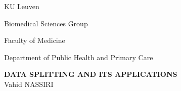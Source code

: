 \begin{titlepage}
{\selectfont
\vspace*{-2.9cm}
{
\centerline{KU Leuven \hfill }
\centerline{Biomedical Sciences Group \hfill }
\centerline{Faculty of Medicine \hfill } 
\centerline{Department of Public Health and Primary Care \hfill } }
\vspace*{-2.2cm}
\hspace{2cm}


\begin{minipage}{1.2\textwidth}													%
\begin{flushleft} %
\vspace{2cm}
\hspace{1cm}\textbf{\Large{DATA SPLITTING AND ITS APPLICATIONS}} \\

\vspace{0.7cm}
\hspace{1cm}\large{Vahid NASSIRI}
\end{flushleft}																	
\end{minipage}	

}
\end{titlepage}
